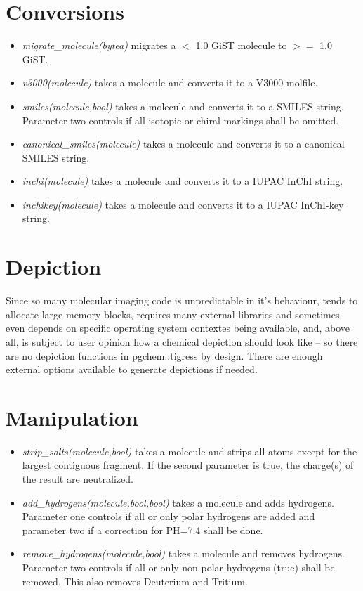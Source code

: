 \documentclass[a4paper]{article}
\begin{document}
\section{Conversions}
\begin{itemize}
\item\textit{migrate\_molecule(bytea)} migrates a $<$ 1.0 GiST molecule to $>=$ 1.0 GiST.
\item\textit{v3000(molecule)} takes a molecule and converts it to a V3000 molfile.
\item\textit{smiles(molecule,bool)} takes a molecule and converts it to a SMILES string. Parameter two controls if all isotopic or chiral markings shall be omitted.
\item\textit{canonical\_smiles(molecule)} takes a molecule and converts it to a canonical SMILES string.
\item\textit{inchi(molecule)} takes a molecule and converts it to a IUPAC InChI string.
\item\textit{inchikey(molecule)} takes a molecule and converts it to a IUPAC InChI-key string.
\end{itemize}
\section{Depiction}
Since so many molecular imaging code is unpredictable in it's behaviour, tends to allocate large memory blocks, requires many external libraries and sometimes even depends on specific operating system contextes being available, and, above all, is subject to user opinion how a chemical depiction should look like -- so there are no depiction functions in pgchem::tigress by design. There are enough external options available to generate depictions if needed.
\section{Manipulation}
\begin{itemize}
\item\textit{strip\_salts(molecule,bool)} takes a molecule and strips all atoms except for the largest contiguous fragment. If the second parameter is true, the charge(s) of the result are neutralized.
\item\textit{add\_hydrogens(molecule,bool,bool)} takes a molecule and adds hydrogens. Parameter one controls if  all or only polar hydrogens are added and parameter two if a correction for PH=7.4 shall be done.
\item\textit{remove\_hydrogens(molecule,bool)} takes a molecule and removes hydrogens. Parameter two controls if all or only non-polar hydrogens (true) shall be removed. This also removes Deuterium and Tritium.
\end{itemize}
\end{document}

